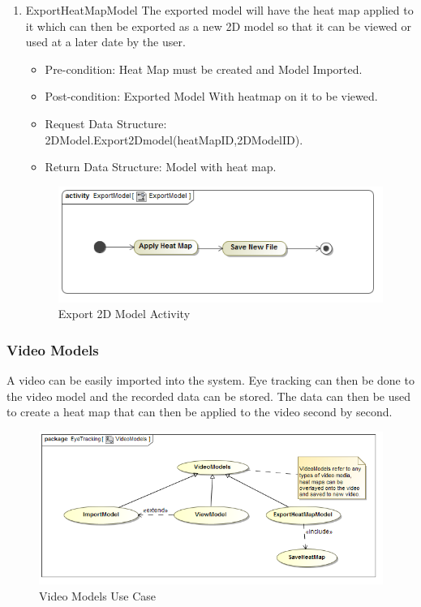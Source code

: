 \begin{enumerate}
		\item{ExportHeatMapModel}
		The exported model will have the heat map applied to it which can then be exported as a new 2D model so that it can be viewed or used at a later date by the user.  
		\begin{itemize}
			\item Pre-condition: Heat Map must be created and Model Imported.
			\item Post-condition: Exported Model With heatmap on it to be viewed.
			\item Request Data Structure: 2DModel.Export2Dmodel(heatMapID,2DModelID).
			\item Return Data Structure: Model with heat map.
		\end{itemize}
		
		\begin{figure}[!ht]
			\centering
			\includegraphics[scale=0.5]{Diagrams/Activity_Diagram__ExportModel__ExportModel.png}
			\caption{Export 2D Model Activity}
		\end{figure}
	
	\end{enumerate}
		
		
	\subsubsection{Video Models}
	A video can be easily imported into the system. Eye tracking can then be done to the video model and the recorded data can be stored. The data can then be used to create a heat map that can then be applied to the video second by second.
	\newline
	
	\begin{figure}[!ht]
		\centering
		\includegraphics[scale=0.5]{Diagrams/Use_Case_Diagram__VideoModels.png}
		\caption{Video Models Use Case}
	\end{figure}
	
